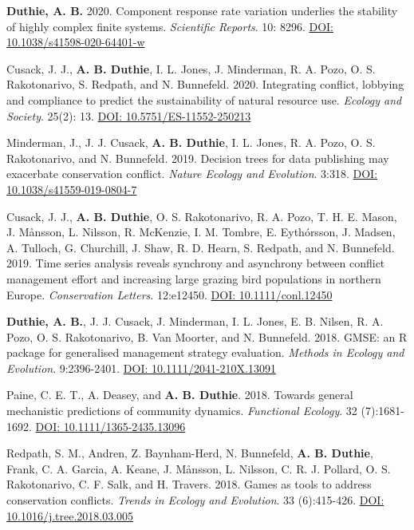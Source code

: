 \documentclass[letterpaper]{article}
\begin{document}
\begin{etaremune}
\item {\bf Duthie, A. B.} 2020. Component response rate variation underlies the stability of highly complex finite systems. {\it Scientific Reports}. 10: 8296. \href{https://www.nature.com/articles/s41598-020-64401-w}{DOI: 10.1038/s41598-020-64401-w}
\item Cusack, J. J., {\bf A. B. Duthie}, I. L. Jones, J. Minderman, R. A. Pozo, O. S. Rakotonarivo, S. Redpath, and N. Bunnefeld. 2020. Integrating conflict, lobbying and compliance to predict the sustainability of natural resource use. {\it Ecology and Society}. 25(2): 13. \href{https://doi.org/10.5751/ES-11552-250213}{DOI: 10.5751/ES-11552-250213}
\item Minderman, J., J. J. Cusack, {\bf A. B. Duthie}, I. L. Jones, R. A. Pozo, O. S. Rakotonarivo, and N. Bunnefeld. 2019. Decision trees for data publishing may exacerbate conservation conflict. {\it Nature Ecology and Evolution}. 3:318. \href{https://doi.org/10.1038/s41559-019-0804-7}{DOI: 10.1038/s41559-019-0804-7}
\item Cusack, J. J., {\bf A. B. Duthie}, O. S. Rakotonarivo, R. A. Pozo, T. H. E. Mason, J. M\r{a}nsson, L. Nilsson, R. McKenzie, I. M. Tombre, E. Eyth\'{o}rsson, J. Madsen, A. Tulloch, G. Churchill, J. Shaw, R. D. Hearn, S. Redpath, and N. Bunnefeld. 2019. Time series analysis reveals synchrony and asynchrony between conflict management effort and increasing large grazing bird populations in northern Europe. {\it Conservation Letters}. 12:e12450. \href{http://onlinelibrary.wiley.com/doi/10.1111/conl.12450/full}{DOI: 10.1111/conl.12450}
\item {\bf Duthie, A. B.}, J. J. Cusack, J. Minderman, I. L. Jones, E. B. Nilsen, R. A. Pozo, O. S. Rakotonarivo, B. Van Moorter, and N. Bunnefeld. 2018. GMSE: an R package for generalised management strategy evaluation. {\it Methods in Ecology and Evolution}. 9:2396-2401. \href{https://besjournals.onlinelibrary.wiley.com/doi/10.1111/2041-210X.13091}{DOI: 10.1111/2041-210X.13091} 
\item Paine, C. E. T., A. Deasey, and {\bf A. B. Duthie}. 2018. Towards general mechanistic predictions of community dynamics. {\it Functional Ecology}. 32 (7):1681-1692. \href{http://onlinelibrary.wiley.com/doi/10.1111/1365-2435.13096/pdf}{DOI: 10.1111/1365-2435.13096}
\item Redpath, S. M., Andren, Z. Baynham-Herd, N. Bunnefeld, {\bf A. B. Duthie}, Frank, C. A. Garcia, A. Keane, J. M\r{a}nsson, L. Nilsson, C. R. J. Pollard, O. S. Rakotonarivo, C. F. Salk, and H. Travers. 2018. Games as tools to address conservation conflicts. {\it Trends in Ecology and Evolution}. 33 (6):415-426. \href{https://www.cell.com/trends/ecology-evolution/fulltext/S0169-5347(18)30059-4}{DOI: 10.1016/j.tree.2018.03.005}

\end{etaremune}
\end{document}
